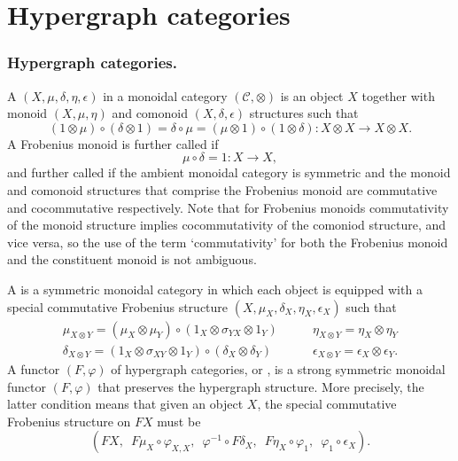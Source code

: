 \chapter{Hypergraph categories}


\subsection{Hypergraph categories.}

A  $(X,\mu,\delta,\eta,\epsilon)$ in a monoidal
category $(\mathcal C, \otimes)$ is an object $X$ together with monoid $(X,\mu,
\eta)$ and comonoid $(X,\delta,\epsilon)$ structures such that
\[
  (1 \otimes \mu) \circ (\delta \otimes 1) = \delta \circ \mu = (\mu \otimes 1)
  \circ (1 \otimes \delta)\colon  X \otimes X \longrightarrow X \otimes X.
\]
A Frobenius monoid is further called  if 
\[
  \mu \circ \delta = 1\colon  X \longrightarrow X,
\]
and further called  if the ambient monoidal category is symmetric
and the monoid and comonoid structures that comprise the Frobenius monoid are
commutative and cocommutative respectively. Note that for Frobenius monoids
commutativity of the monoid structure implies cocommutativity of the comoniod
structure, and vice versa, so the use of the term `commutativity' for both the
Frobenius monoid and the constituent monoid is not ambiguous.

A  is a
symmetric monoidal category in which each object is equipped with a special
commutative Frobenius structure $(X,\mu_X,\delta_X,\eta_X,\epsilon_X)$ such that 
\[
  \begin{array}{cc}
    \mu_{X\otimes Y} = (\mu_X \otimes \mu_Y)\circ(1_X \otimes \sigma_{YX}\otimes
    1_Y) \qquad&
    \eta_{X\otimes Y} = \eta_X \otimes \eta_Y \\
    \delta_{X\otimes Y} = (1_X \otimes \sigma_{XY}\otimes 1_Y)\circ(\delta_X
    \otimes \delta_Y) \qquad&
    \epsilon_{X\otimes Y} = \epsilon_X \otimes \epsilon_Y.
  \end{array}
\]
A functor $(F,\varphi)$ of hypergraph categories, or , is a strong symmetric monoidal functor $(F,\varphi)$ that preserves
the hypergraph structure. More precisely, the latter condition means that given
an object $X$, the special commutative Frobenius structure on $FX$ must be 
\[
  (FX,\enspace F\mu_X \circ \varphi_{X,X},\enspace  \varphi^{-1} \circ F\delta_X,\enspace  F\eta_X \circ
\varphi_1,\enspace  \varphi_1 \circ \epsilon_X).
\]

